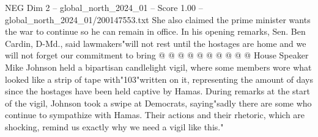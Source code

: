 \begin{textsample}{NEG Dim 2 – global\_north\_2024\_01 – Score 1.00 – global\_north\_2024\_01/200147553.txt}
She also claimed the prime minister wants the war to continue so he can remain in office.
In his opening remarks, Sen.
Ben Cardin, D-Md., said lawmakers"will not rest until the hostages are home and we will not forget our commitment to bring @ @ @ @ @ @ @ @ @ @ House Speaker Mike Johnson held a bipartisan candlelight vigil, where some members wore what looked like a strip of tape with"103"written on it, representing the amount of days since the hostages have been held captive by Hamas.
During remarks at the start of the vigil, Johnson took a swipe at Democrats, saying"sadly there are some who continue to sympathize with Hamas.
Their actions and their rhetoric, which are shocking, remind us exactly why we need a vigil like this."

\end{textsample}
